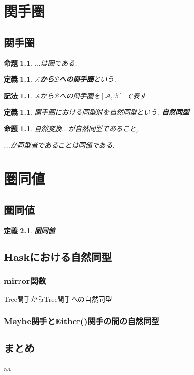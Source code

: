 \documentclass[dvipdfmx]{jsbook}
\theoremstyle{plain}
\newtheorem{Def}[thm]{定義}
\newtheorem{Notation}[thm]{記法}
\newtheorem{Prop}[thm]{命題}
\begin{document}
\chapter{関手圏}
\section{関手圏}
\begin{Prop}
...は圏である.
\end{Prop}
\begin{Def}
{\bf $\mathscr{A}$から$\mathscr{B}$への関手圏}という.
\end{Def}
\begin{Notation}
$\mathscr{A}$から$\mathscr{B}$への関手圏を$[\mathscr{A},\mathscr{B}]$
で表す\end{Notation}
\begin{Def}
関手圏における同型射を自然同型という.
\bf{自然同型}
\end{Def}
\begin{Prop}
自然変換...が自然同型であること,

...が同型者であることは同値である.
\end{Prop}
\chapter{圏同値}
\section{圏同値}
\begin{Def}
\bf{圏同値}
\end{Def}

\section{Haskにおける自然同型}
\subsection{mirror関数}
Tree関手からTree関手への自然同型
\subsection{Maybe関手とEither()関手の間の自然同型}
\section{まとめ}
aa
\printindex
\end{document}

